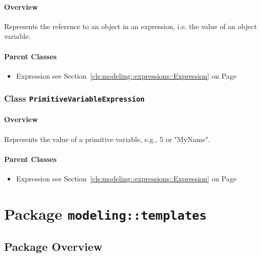 \paragraph{Overview}

	
			
Represents the reference to an object in an expression, i.e. the value of an object variable.	
		
	



\paragraph{Parent Classes}
\begin{itemize}
\item Expression see Section~\ref{cls:modeling::expressions::Expression} on Page~\pageref{cls:modeling::expressions::Expression}\end{itemize}
\subsubsection{\Large{Class \bfseries \texttt{PrimitiveVariableExpression}\normalfont}}
\label{cls:modeling::patterns::expressions::PrimitiveVariableExpression} 
\paragraph{Overview}

	
			
Represents the value of a primitive variable, e.g., 5 or "MyName".	
		
	



\paragraph{Parent Classes}
\begin{itemize}
\item Expression see Section~\ref{cls:modeling::expressions::Expression} on Page~\pageref{cls:modeling::expressions::Expression}\end{itemize}
\newpage
		


\section{Package \bfseries \texttt{modeling::templates}\normalfont}
\subsection{Package Overview}
	

